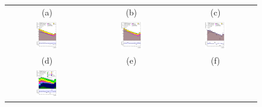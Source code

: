 \documentclass[PAPER, coverpage, atlasdraft=true, texlive=2016, UKenglish]{\ATLASLATEXPATH atlasdoc}
\begin{document}
\begin{figure}[H]
\begin{tabular}{@{}ccc@{}}
(a) & (b) & (c) \\
\includegraphics[page=1,width=0.28\textwidth]{figures/new_pt/log_or_nolog/tuH_reg1l1tau1b2j_os_log_.pdf}&
\includegraphics[page=1,width=0.28\textwidth]{figures/new_pt/log_or_nolog/tuH_reg1l1tau1b3j_os_log_.pdf} &
\includegraphics[page=1,width=0.28\textwidth]{figures/new_pt/log_or_nolog/tuH_reg1l2tau1bnj_ss_log_.pdf} \\
(d) & (e) & (f)\\
\includegraphics[page=1,width=0.28\textwidth]{figures/new_pt/log_or_nolog/tuH_reg2mtau1b2jos_log_.pdf}&

\end{tabular}
\end{figure}
\end{document}
